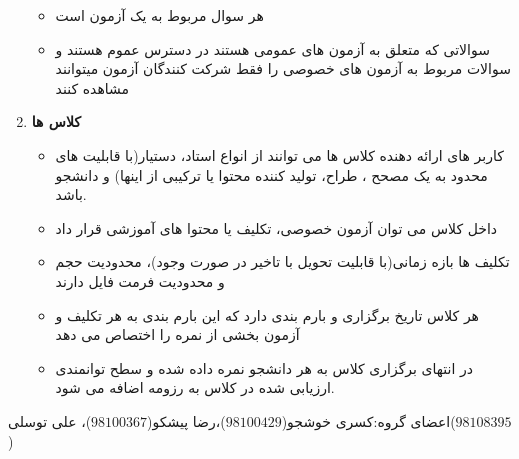 \documentclass{article}
\begin{document}
\begin{enumerate}[\hspace{1cm}1.]
\begin{itemize}
            \item هر سوال مربوط به یک آزمون است
            \item سوالاتی که متعلق به آزمون های عمومی هستند در دسترس عموم هستند و سوالات مربوط به آزمون های خصوصی را فقط شرکت کنندگان آزمون میتوانند مشاهده کنند
        \end{itemize}
        
        \item \textbf{کلاس ها}
        \begin{itemize}
            \item کاربر های ارائه دهنده کلاس ها می توانند از انواع استاد، دستیار(با قابلیت های محدود به یک مصحح ، طراح، تولید کننده محتوا یا ترکیبی از اینها) و دانشجو باشد.
            \item داخل کلاس می توان آزمون خصوصی، تکلیف یا محتوا های آموزشی قرار داد
            \item تکلیف ها بازه زمانی(با قابلیت تحویل با تاخیر در صورت وجود)، محدودیت حجم و محدودیت فرمت فایل دارند
            \item هر کلاس تاریخ برگزاری و بارم بندی دارد که این بارم بندی به هر تکلیف و آزمون بخشی از نمره را اختصاص می دهد
            \item در انتهای برگزاری کلاس به هر دانشجو نمره داده شده و سطح توانمندی ارزیابی شده در کلاس به رزومه اضافه می شود.
        \end{itemize}
        
    \end{enumerate}
    \vspace{4cm}
    \centering
    اعضای گروه:کسری خوشجو($98100429$)،رضا پیشکو($98100367$)، علی توسلی($98108395$)
    
\end{document}
